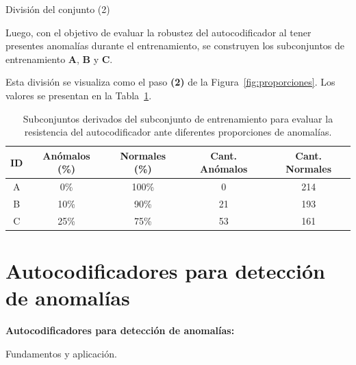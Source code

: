\documentclass{beamer}
\begin{document}
\begin{frame}{División del conjunto (2)}
	\small
	\justifying
	
	\begin{block}{}
		Luego, con el objetivo de evaluar la robustez del autocodificador al tener presentes anomalías durante el entrenamiento, se construyen los subconjuntos de entrenamiento \textbf{A}, \textbf{B} y \textbf{C}.
	\end{block}
	
	\begin{block}{}
		Esta división se visualiza como el paso \textbf{(2)} de la Figura~\ref{fig:proporciones}. Los valores se presentan en la Tabla~\ref{tab:proporciones_conjunto}.
	\end{block}

	\centering
	\begin{table}[H]
		\centering
		\begin{tabular}{ccccc}
			\toprule
			\textbf{ID} & \textbf{Anómalos (\%)} & \textbf{Normales (\%)} & \textbf{Cant. Anómalos} & \textbf{Cant. Normales} \\
			\midrule
			A & 0\%  & 100\% & 0  & 214 \\
			B & 10\% & 90\%  & 21 & 193 \\
			C & 25\% & 75\%  & 53 & 161 \\
			\bottomrule
		\end{tabular}
		\caption{Subconjuntos derivados del subconjunto de entrenamiento para evaluar la resistencia del autocodificador ante diferentes proporciones de anomalías.}
		\label{tab:proporciones_conjunto}
	\end{table}
\end{frame}

\section{Autocodificadores para detección de anomalías}

\begin{frame}
	\begin{center}
		\textcolor{unahurverde}{\textbf{Autocodificadores para detección de anomalías:}}
	\end{center}
	\centering
	
	Fundamentos y aplicación.
\end{frame}
\end{document}
